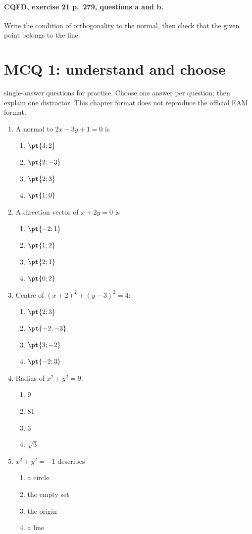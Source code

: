 \paragraph{CQFD, exercise 21 p.~279, questions a and b.}\label{C07-M2} Write the condition of orthogonality to the normal, then check that the given point belongs to the line.
\begingroup\small
\mxnewpage\section*{MCQ 1: understand and choose}\label{C07-Q1}
 single-answer questions for practice. Choose one answer per question; then explain one distractor. This chapter format does not reproduce the official EAM format.
\begin{enumerate}
\item A normal to $2x-3y+1=0$ is
\begin{enumerate}[label=\Alph*.,itemsep=2pt]
\item $\pt{3;2}$
\item $\pt{2;-3}$
\item $\pt{2;3}$
\item $\pt{1;0}$
\end{enumerate}
\item A direction vector of $x+2y=0$ is
\begin{enumerate}[label=\Alph*.,itemsep=2pt]
\item $\pt{-2;1}$
\item $\pt{1;2}$
\item $\pt{2;1}$
\item $\pt{0;2}$
\end{enumerate}
\item Centre of $(x+2)^2+(y-3)^2=4$:
\begin{enumerate}[label=\Alph*.,itemsep=2pt]
\item $\pt{2;3}$
\item $\pt{-2;-3}$
\item $\pt{3;-2}$
\item $\pt{-2;3}$
\end{enumerate}
\item Radius of $x^2+y^2=9$:
\begin{enumerate}[label=\Alph*.,itemsep=2pt]
\item $9$
\item $81$
\item $3$
\item $\sqrt3$
\end{enumerate}
\item $x^2+y^2=-1$ describes
\begin{enumerate}[label=\Alph*.,itemsep=2pt]
\item a circle
\item the empty set
\item the origin
\item a line
\end{enumerate}
\end{enumerate}
